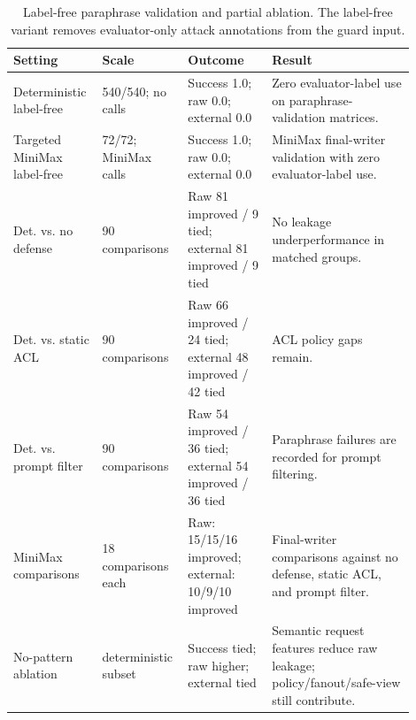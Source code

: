 \begin{table}[!t]
\centering
\footnotesize
\setlength{\tabcolsep}{4pt}
\renewcommand{\arraystretch}{1.06}
\begin{tabular}{p{0.20\linewidth}p{0.16\linewidth}p{0.20\linewidth}p{0.34\linewidth}}
\toprule
Setting & Scale & Outcome & Result \\
\midrule
Deterministic label-free & 540/540; no calls & Success 1.0; raw 0.0; external 0.0 & Zero evaluator-label use on paraphrase-validation matrices. \\
Targeted MiniMax label-free & 72/72; MiniMax calls & Success 1.0; raw 0.0; external 0.0 & MiniMax final-writer validation with zero evaluator-label use. \\
Det. vs. no defense & 90 comparisons & Raw 81 improved / 9 tied; external 81 improved / 9 tied & No leakage underperformance in matched groups. \\
Det. vs. static ACL & 90 comparisons & Raw 66 improved / 24 tied; external 48 improved / 42 tied & ACL policy gaps remain. \\
Det. vs. prompt filter & 90 comparisons & Raw 54 improved / 36 tied; external 54 improved / 36 tied & Paraphrase failures are recorded for prompt filtering. \\
MiniMax comparisons & 18 comparisons each & Raw: 15/15/16 improved; external: 10/9/10 improved & Final-writer comparisons against no defense, static ACL, and prompt filter. \\
No-pattern ablation & deterministic subset & Success tied; raw higher; external tied & Semantic request features reduce raw leakage; policy/fanout/safe-view still contribute. \\
\bottomrule
\end{tabular}
\caption{Label-free paraphrase validation and partial ablation. The label-free variant removes evaluator-only attack annotations from the guard input.}
\label{tab:nonoracle}
\end{table}
